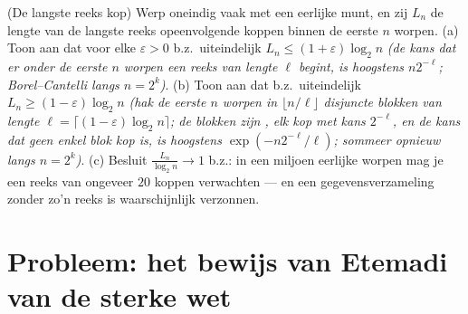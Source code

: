 \begin{exercise}[$\star\star$]\label{exo:b3:probability:12}
(De langste reeks kop) Werp oneindig vaak met een eerlijke munt,
en zij $L_n$ de lengte van de langste reeks opeenvolgende koppen
binnen de eerste $n$ worpen.
(a) Toon aan dat voor elke $\varepsilon > 0$ b.z.\ uiteindelijk
$L_n \leq (1 + \varepsilon)\log_2n$ \emph{(de kans dat er onder
de eerste $n$ worpen een reeks van lengte $\ell$ begint, is
hoogstens $n2^{-\ell}$; Borel--Cantelli langs $n = 2^k$)}.
(b) Toon aan dat b.z.\ uiteindelijk $L_n \geq (1 -
\varepsilon)\log_2n$ \emph{(hak de eerste $n$ worpen in
$\lfloor n/\ell\rfloor$ disjuncte blokken van lengte $\ell =
\lceil(1 - \varepsilon)\log_2n\rceil$; de blokken zijn
, elk  kop met kans $2^{-\ell}$, en de kans
dat geen enkel blok  kop is, is hoogstens
$\exp(-n2^{-\ell}/\ell)$; sommeer opnieuw langs $n = 2^k$)}.
(c) Besluit $\frac{L_n}{\log_2n} \to 1$ b.z.: in een miljoen
eerlijke worpen mag je een reeks van ongeveer $20$ koppen
verwachten --- en een gegevensverzameling zonder zo'n reeks is
waarschijnlijk verzonnen.
\end{exercise}

\section{Probleem: het bewijs van Etemadi van de sterke wet}

